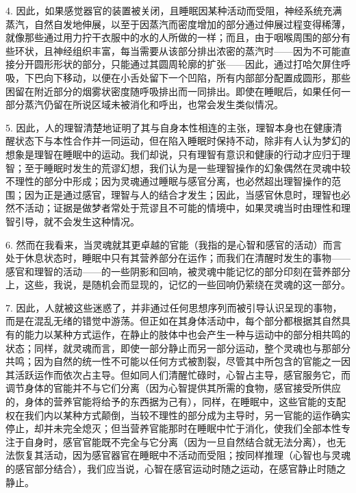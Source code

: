 4. 因此，如果感觉器官的装置被关闭，且睡眠因某种活动而受阻，神经系统充满蒸汽，自然自发地伸展，以至于因蒸汽而密度增加的部分通过伸展过程变得稀薄，就像那些通过用力拧干衣服中的水的人所做的一样；而且，由于咽喉周围的部分有些环状，且神经组织丰富，每当需要从该部分排出浓密的蒸汽时——因为不可能直接分开圆形形状的部分，只能通过其圆周轮廓的扩张——因此，通过打哈欠屏住呼吸，下巴向下移动，以便在小舌处留下一个凹陷，所有内部部分配置成圆形，那些困留在附近部分的烟雾状密度随呼吸排出而一同排出。即使在睡眠后，如果任何一部分蒸汽仍留在所说区域未被消化和呼出，也常会发生类似情况。\par

5. 因此，人的理智清楚地证明了其与自身本性相连的主张，理智本身也在健康清醒状态下与本性合作并一同运动，但在陷入睡眠时保持不动，除非有人认为梦幻的想象是理智在睡眠中的运动。我们却说，只有理智有意识和健康的行动才应归于理智；至于睡眠时发生的荒谬幻想，我们认为是一些理智操作的幻象偶然在灵魂中较不理性的部分中形成；因为灵魂通过睡眠与感官分离，也必然超出理智操作的范围；因为正是通过感官，理智与人的结合才发生；因此，当感官休息时，理智也必然不活动；证据是做梦者常处于荒谬且不可能的情境中，如果灵魂当时由理性和理智引导，就不会发生这种情况。\par

6. 然而在我看来，当灵魂就其更卓越的官能（我指的是心智和感官的活动）而言处于休息状态时，睡眠中只有其营养部分在运作；而我们在清醒时发生的事物——感官和理智的活动——的一些阴影和回响，被灵魂中能记忆的部分印刻在营养部分上，这些，我说，是随机会而显现的，记忆的一些回响仍萦绕在灵魂的这一部分。\par

7. 因此，人就被这些迷惑了，并非通过任何思想序列而被引导认识呈现的事物，而是在混乱无绪的错觉中游荡。但正如在其身体活动中，每个部分都根据其自然具有的能力以某种方式运作，在静止的肢体中也会产生一种与运动中的部分相共鸣的状态；同样，就灵魂而言，即使一部分静止而另一部分运动，整个灵魂也与那部分共鸣；因为自然的统一性不可能以任何方式被割裂，尽管其中所包含的官能之一因其活跃运作而依次占主导。但如同人们清醒忙碌时，心智占主导，感官服务它，而调节身体的官能并不与它们分离（因为心智提供其所需的食物，感官接受所供应的，身体的营养官能将给予的东西据为己有），同样，在睡眠中，这些官能的支配权在我们内以某种方式颠倒，当较不理性的部分成为主导时，另一官能的运作确实停止，却并未完全熄灭；但当营养官能那时在睡眠中忙于消化，使我们全部本性专注于自身时，感官官能既不完全与它分离（因为一旦自然结合就无法分离），也无法恢复其活动，因为感官器官在睡眠中不活动而受阻；按同样推理（心智也与灵魂的感官部分结合），我们应当说，心智在感官运动时随之运动，在感官静止时随之静止。\par


